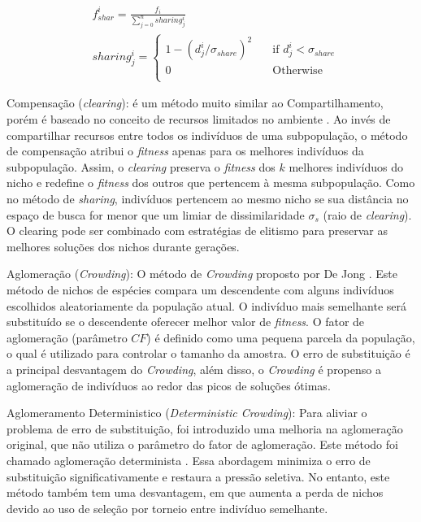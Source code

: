 \begin{equation}
\label{eq:sharing}
\begin{split}
& f_{shar}^i = \frac{f_i}{\sum_{j=0}^{n} sharing_j^i} \\
& sharing_j^i =
	\begin{cases}
	1 - (d_j^i/\sigma_{share})^2 	& \quad \text{if } d_j^i < \sigma_{share}\\
	0 							& \quad \text{Otherwise}\\
	\end{cases} 
\end{split}
\end{equation}

Compensação (\textit{clearing}): é um método muito similar ao Compartilhamento, porém é baseado no conceito de recursos limitados no ambiente \cite{clearing}. Ao invés de compartilhar recursos entre todos os indivíduos de uma subpopulação, o método de compensação atribui o \textit{fitness} apenas para os melhores indivíduos da subpopulação. Assim, o \textit{clearing} preserva o \textit{fitness} dos $k$ melhores indivíduos do nicho e redefine o \textit{fitness} dos outros que pertencem à mesma subpopulação. Como no método de \textit{sharing}, indivíduos pertencem ao mesmo nicho se sua distância no espaço de busca for menor
que um limiar de dissimilaridade $\sigma_s$ (raio de \textit{clearing}). O clearing pode ser combinado com estratégias de elitismo para preservar as melhores soluções dos nichos durante gerações.

Aglomeração (\textit{Crowding}): O método de \textit{Crowding} proposto por De Jong \cite{crowding}. Este método de nichos de espécies compara um descendente com alguns indivíduos escolhidos aleatoriamente da população atual. O indivíduo mais semelhante será substituído se o descendente oferecer melhor valor de \textit{fitness}. O fator de aglomeração (parâmetro $CF$) é definido como uma pequena parcela da população, o qual é utilizado para controlar o tamanho da amostra. O erro de substituição é a principal desvantagem do  \textit{Crowding}, além disso, o \textit{Crowding} é propenso a aglomeração de indivíduos ao redor das picos de soluções ótimas.

Aglomeramento Deterministico (\textit{Deterministic Crowding}): Para aliviar o problema de erro de substituição, foi introduzido uma melhoria na aglomeração original, que não utiliza o parâmetro do fator de aglomeração. Este método foi chamado aglomeração determinista \cite{deterministic_crowding}. Essa abordagem minimiza o erro de substituição significativamente e restaura a pressão seletiva. No entanto, este método também tem uma desvantagem, em que aumenta a perda de nichos devido ao uso de seleção por torneio entre indivíduo semelhante.

